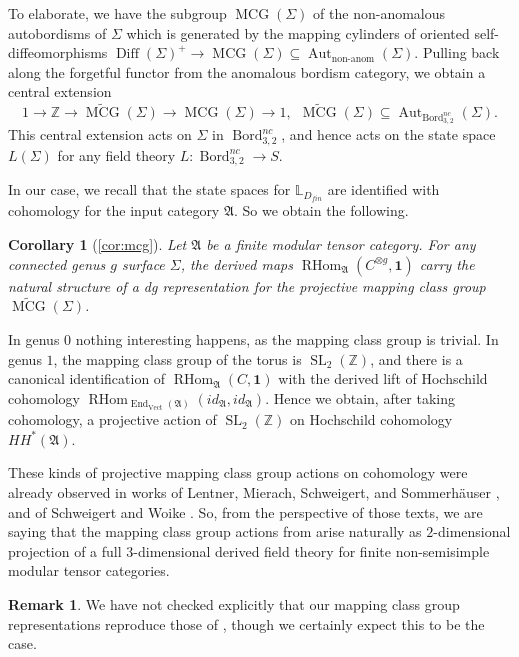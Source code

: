 \documentclass[reqno]{amsart}
\newtheorem*{corollaryA}{Corollary}
\theoremstyle{definition}
\newtheorem{remark}[lemma]{Remark}
\newcommand{\mfk}[1]{\mathfrak{#1}}
\newcommand{\mbb}[1]{\mathbb{#1}}
\newcommand{\opn}[1]{\operatorname{#1}}
\newcommand{\ot}{\otimes}
\DeclareMathOperator{\End}{End}
\DeclareMathOperator{\RHom}{RHom}
\DeclareMathOperator{\Bord}{Bord}
\renewcommand{\1}{\mathbf{1}}
\begin{document}
To elaborate, we have the subgroup $\opn{MCG}(\Sigma)$ of the non-anomalous autobordisms of $\Sigma$ which is generated by the mapping cylinders of oriented self-diffeomorphisms $\opn{Diff}(\Sigma)^{+}\to \opn{MCG}(\Sigma)\subseteq \opn{Aut}_{\text{non-anom}}(\Sigma)$.  Pulling back along the forgetful functor from the anomalous bordism category, we obtain a central extension
\[
1\to \mbb{Z}\to \tilde{\opn{MCG}}(\Sigma)\to \opn{MCG}(\Sigma)\to 1,\ \ \tilde{\opn{MCG}}(\Sigma)\subseteq \opn{Aut}_{\Bord^{nc}_{3,2}}(\Sigma).
\]
This central extension acts on $\Sigma$ in $\Bord_{3,2}^{nc}$, and hence acts on the state space $L(\Sigma)$ for any field theory $L:\Bord_{3,2}^{nc}\to S$.
\par

In our case, we recall that the state spaces for $\mbb{L}_{D_{fin}}$ are identified with cohomology for the input category $\mfk{A}$.  So we obtain the following.

\begin{corollaryA}[\ref{cor:mcg}]
Let $\mfk{A}$ be a finite modular tensor category.  For any connected genus $g$ surface $\Sigma$, the derived maps $\RHom_{\mfk{A}}(C^{\ot g},\1)$ carry the natural structure of a dg representation for the projective mapping class group $\tilde{\opn{MCG}}(\Sigma)$.
\end{corollaryA}

In genus $0$ nothing interesting happens, as the mapping class group is trivial.  In genus $1$, the mapping class group of the torus is $\opn{SL}_2(\mbb{Z})$, and there is a canonical identification of $\RHom_{\mfk{A}}(C,\1)$ with the derived lift of Hochschild cohomology $\RHom_{\End_{\opn{Vect}}(\mfk{A})}(id_{\mfk{A}},id_{\mfk{A}})$.  Hence we obtain, after taking cohomology, a projective action of $\opn{SL}_2(\mbb{Z})$ on Hochschild cohomology $HH^{\ast}(\mfk{A})$.
\par

These kinds of projective mapping class group actions on cohomology were already observed in works of Lentner, Mierach, Schweigert, and Sommerhäuser \cite{lentneretal23}, and of Schweigert and Woike \cite{schweigertwoike21}.  So, from the perspective of those texts, we are saying that the mapping class group actions from \cite{lentneretal23,schweigertwoike21} arise naturally as $2$-dimensional projection of a full $3$-dimensional derived field theory for finite non-semisimple modular tensor categories.

\begin{remark}
We have not checked explicitly that our mapping class group representations reproduce those of \cite{lentneretal23,schweigertwoike21}, though we certainly expect this to be the case.
\end{remark}
\end{document}
